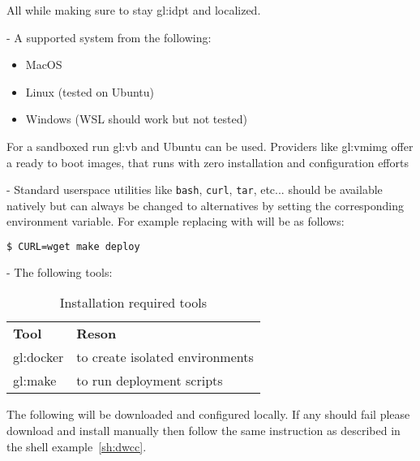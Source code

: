 All while making sure to stay \gls{gl:idpt} and localized.


- A supported system from the following:

\begin{itemize}
  \item MacOS
  \item Linux (tested on Ubuntu)
  \item Windows (WSL should work but not tested)
\end{itemize}

For a sandboxed run \gls{gl:vb} and Ubuntu can be used. Providers like \gls{gl:vmimg} offer a ready to boot images, that runs with zero installation and configuration efforts

- Standard userspace utilities like \lstinline[columns=fixed]{bash}, \lstinline[columns=fixed]{curl}, \lstinline[columns=fixed]{tar}, etc... should be available natively but can always be changed to alternatives by setting the corresponding environment variable. For example replacing  with  will be as follows:

\begin{lstlisting}[language=bash, caption={Deploy with custom command}, label={sh:dwcc}]
    $ CURL=wget make deploy
\end{lstlisting}

- The following tools:

\begin{table}[H]
  \begin{center}
    \label{tab:irt}
    \def\arraystretch{1.5}
    \begin{tabularx}{\linewidth}{|l X |}
      \hline
      \rowcolor{gray!20}
      \textbf{Tool} & \textbf{Reson}\\
      \gls{gl:docker} & to create isolated environments\\
      \gls{gl:make} & to run deployment scripts\\
      \hline
    \end{tabularx}
    \caption{Installation required tools}
  \end{center}
\end{table}

\label{hdr:auto}

The following will be downloaded and configured locally. If any should fail please download and install manually then follow the same instruction as described in the shell example~\ref{sh:dwcc}.

